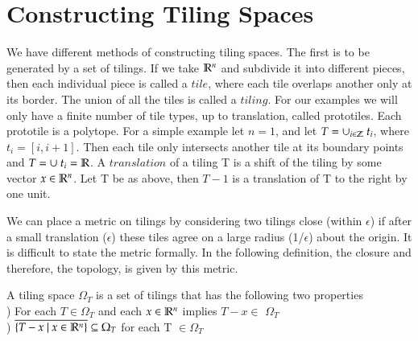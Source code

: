 
\chapter{\sc Constructing Tiling Spaces}

We have different methods of constructing tiling spaces.  The first is to be generated by a set of tilings.  If we take $\mathbb{R}^n$ and subdivide it into different pieces, then each individual piece is called a $\mathit{tile}$, where each tile overlaps another only at its border.  The union of all the tiles is called a $\mathit{tiling}$. For our examples we will only have a finite number of tile types, up to translation, called prototiles.  Each prototile is a polytope.  For a simple example let $n=1$, and let  $T= \cup_{i\in \mathbb{Z}} \ t_i$, where $t_i = [i, i+1]$.  Then each tile only intersects another tile at its boundary points and $T=\cup \ t_i = \mathbb{R}$.
 A $\mathit{translation}$ of a tiling T is a shift of the tiling by some vector $x\in \mathbb{R}^n$.  Let T be as above, then $T-1$ is a translation of T to the right by one unit.  
 
 We can place a metric on tilings by considering two tilings close (within $\epsilon$) if after a small translation ($\epsilon$) these tiles agree on a large radius (1/$\epsilon$) about the origin.  It is difficult to state the metric formally.  In the following definition, the closure and therefore, the topology, is given by this metric.
 
 \begin{definition}
 A tiling space $\Omega_T$ is a set of tilings that has the following two properties
 \\ ) For each $T \in \Omega_T$ and each $x \in \mathbb{R}^n$ implies $T-x \in$ $\Omega_T$
 \\ ) $\overline{ \{ T-x \ | \  x \in \mathbb{R}^n \} }  \subseteq  \Omega_T$ for each T $\in \Omega_T$
 
 \end{definition}
 


